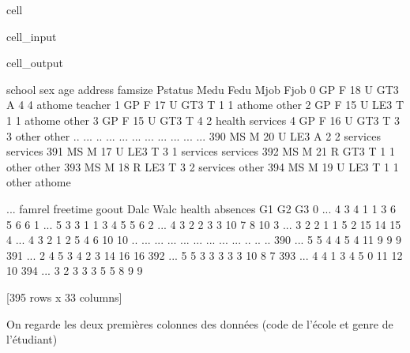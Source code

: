 \documentclass[letterpaper,10pt,french]{sphinxmanual}
\begin{document}
\begin{sphinxuseclass}{cell}
\begin{sphinxuseclass}{cell_input}
\begin{sphinxVerbatim}[commandchars=\\\{\}]
\end{sphinxVerbatim}

\end{sphinxuseclass}
\begin{sphinxuseclass}{cell_output}
\begin{sphinxVerbatim}[commandchars=\\\{\}]
    school sex  age address famsize Pstatus  Medu  Fedu      Mjob      Fjob  \PYGZbs{}
0       GP   F   18       U     GT3       A     4     4   at\PYGZus{}home   teacher   
1       GP   F   17       U     GT3       T     1     1   at\PYGZus{}home     other   
2       GP   F   15       U     LE3       T     1     1   at\PYGZus{}home     other   
3       GP   F   15       U     GT3       T     4     2    health  services   
4       GP   F   16       U     GT3       T     3     3     other     other   
..     ...  ..  ...     ...     ...     ...   ...   ...       ...       ...   
390     MS   M   20       U     LE3       A     2     2  services  services   
391     MS   M   17       U     LE3       T     3     1  services  services   
392     MS   M   21       R     GT3       T     1     1     other     other   
393     MS   M   18       R     LE3       T     3     2  services     other   
394     MS   M   19       U     LE3       T     1     1     other   at\PYGZus{}home   

     ... famrel freetime  goout  Dalc  Walc health absences  G1  G2  G3  
0    ...      4        3      4     1     1      3        6   5   6   6  
1    ...      5        3      3     1     1      3        4   5   5   6  
2    ...      4        3      2     2     3      3       10   7   8  10  
3    ...      3        2      2     1     1      5        2  15  14  15  
4    ...      4        3      2     1     2      5        4   6  10  10  
..   ...    ...      ...    ...   ...   ...    ...      ...  ..  ..  ..  
390  ...      5        5      4     4     5      4       11   9   9   9  
391  ...      2        4      5     3     4      2        3  14  16  16  
392  ...      5        5      3     3     3      3        3  10   8   7  
393  ...      4        4      1     3     4      5        0  11  12  10  
394  ...      3        2      3     3     3      5        5   8   9   9  

[395 rows x 33 columns]
\end{sphinxVerbatim}

\end{sphinxuseclass}
\end{sphinxuseclass}
\sphinxAtStartPar
On regarde les deux premières colonnes des données (code de l’école et genre de l’étudiant)
\end{document}

